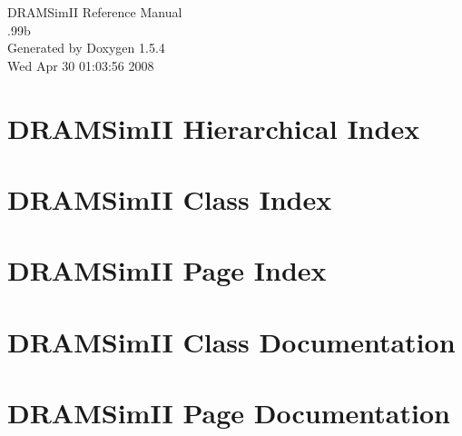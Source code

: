 \documentclass[a4paper]{book}
\begin{document}
\begin{titlepage}
\vspace*{7cm}
\begin{center}
{\Large DRAMSimII Reference Manual\\[1ex]\large .99b }\\
\vspace*{1cm}
{\large Generated by Doxygen 1.5.4}\\
\vspace*{0.5cm}
{\small Wed Apr 30 01:03:56 2008}\\
\end{center}
\end{titlepage}
\clearemptydoublepage
{}
\tableofcontents
\clearemptydoublepage
{}
\chapter{DRAMSimII Hierarchical Index}

\chapter{DRAMSimII Class Index}

\chapter{DRAMSimII Page Index}

\chapter{DRAMSimII Class Documentation}























\chapter{DRAMSimII Page Documentation}

\printindex
\end{document}
